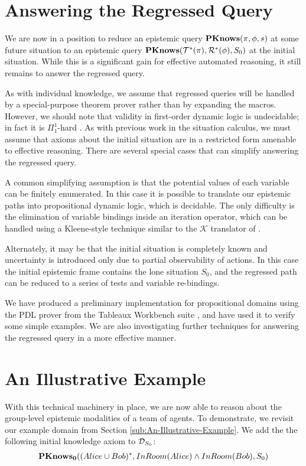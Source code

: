 \section{Answering the Regressed Query}

We are now in a position to reduce an epistemic query $\mathbf{PKnows}(\pi,\phi,s)$
at some future situation to an epistemic query $\mathbf{PKnows}(\mathcal{T}^{*}(\pi),\mathcal{R}^{*}(\phi),S_{0})$
at the initial situation. While this is a significant gain for effective
automated reasoning, it still remains to answer the regressed query.

As with individual knowledge, we assume that regressed queries will
be handled by a special-purpose theorem prover rather than by expanding
the macros. However, we should note that validity in first-order dynamic
logic is undecidable; in fact it is $\Pi_{1}^{1}$-hard \citep{kooi07dyn_termmodal_logic}.
As with previous work in the situation calculus, we must assume that
axioms about the initial situation are in a restricted form amenable
to effective reasoning. There are several special cases that can simplify
answering the regressed query.

A common simplifying assumption is that the potential values of each
variable can be finitely enumerated. In this case it is possible to
translate our epistemic paths into propositional dynamic logic, which
is decidable. The only difficulty is the elimination of variable bindings
inside an iteration operator, which can be handled using a Kleene-style
technique similar to the $\mathcal{K}$ translator of \citet{vanBenthem06lcc}.

Alternately, it may be that the initial situation is completely known
and uncertainty is introduced only due to partial observability of
actions. In this case the initial epistemic frame contains the lone
situation $S_{0}$, and the regressed path can be reduced to a series
of tests and variable re-bindings.

We have produced a preliminary implementation for propositional domains
using the PDL prover from the Tableaux Workbench suite \citep{abate07twb_pdl},
and have used it to verify some simple examples. We are also investigating
further techniques for answering the regressed query in a more effective
manner.


\section{An Illustrative Example}

With this technical machinery in place, we are now able to reason
about the group-level epistemic modalities of a team of agents. To
demonstrate, we revisit our example domain from Section \ref{sub:An-Illustrative-Example}.
We add the the following initial knowledge axiom to $\mathcal{D}_{S_{0}}$:\begin{gather*}
\mathbf{PKnows_{0}}((Alice\cup Bob)^{*},InRoom(Alice)\wedge InRoom(Bob),S_{0})\end{gather*}


